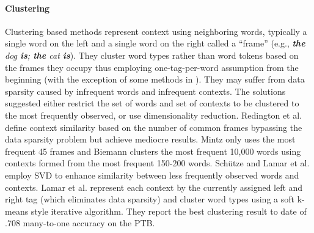 \paragraph{Clustering}
Clustering based methods represent context using neighboring words,
typically a single word on the left and a single word on the right
called a ``frame'' (e.g., {\em {\bf the} dog {\bf is}; {\bf the} cat
  {\bf is}}).  They cluster word types rather than word tokens based
on the frames they occupy thus employing one-tag-per-word assumption
from the beginning (with the exception of some methods in
\cite{Schutze:1995:DPT:976973.976994}).  They may suffer from data
sparsity caused by infrequent words and infrequent contexts.  The
solutions suggested either restrict the set of words and set of
contexts to be clustered to the most frequently observed, or use
dimensionality reduction.  Redington et
al.  define context similarity
based on the number of common frames bypassing the data sparsity
problem but achieve mediocre results.  Mintz
 only uses the most frequent 45 frames
and Biemann  clusters the most
frequent 10,000 words using contexts formed from the most frequent
150-200 words.  Sch\"utze 
and Lamar et al.  employ SVD to
enhance similarity between less frequently observed words and
contexts.  Lamar et al. 
represent each context by the currently assigned left and right tag
(which eliminates data sparsity) and cluster word types using a soft
k-means style iterative algorithm.  They report the best clustering
result to date of .708 many-to-one accuracy on the PTB.

